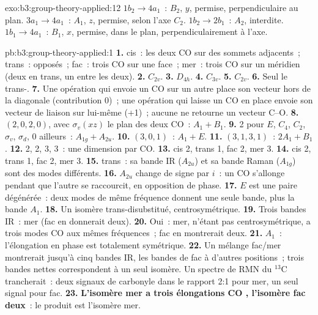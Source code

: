 \begin{solution}{exo:b3:group-theory-applied:12}
$1b_2 \to 4a_1$~: $B_2$, $y$, permise, perpendiculaire au plan. $3a_1 \to 4a_1$~:
$A_1$, $z$, permise, selon l'axe $C_2$. $1b_2 \to 2b_1$~: $A_2$, interdite.
$1b_1 \to 4a_1$~: $B_1$, $x$, permise, dans le plan, perpendiculairement
à l'axe.
\end{solution}

\begin{solution}{pb:b3:group-theory-applied:1}
\textbf{1.} cis~: les deux CO sur des sommets adjacents~; trans~:
opposés~; fac~: trois CO sur une face~; mer~: trois CO sur un méridien
(deux en trans, un entre les deux).
\textbf{2.} $C_{2v}$.
\textbf{3.} $D_{4h}$.
\textbf{4.} $C_{3v}$.
\textbf{5.} $C_{2v}$.
\textbf{6.} Seul le trans-.
\textbf{7.} Une opération qui envoie un CO sur un autre place son vecteur
hors de la diagonale (contribution 0)~; une opération qui laisse un CO en
place envoie son vecteur de liaison sur lui-même (+1)~; aucune ne
retourne un vecteur C--O.
\textbf{8.}  $(2, 0, 2, 0)$, avec $\sigma_v(xz)$ le plan des
deux CO~: $A_1 +
B_1$.
\textbf{9.}  2 pour $E$, $C_4$, $C_2$, $\sigma_v$, $\sigma_d$,
0 ailleurs~:
$A_{1g} + A_{2u}$.
\textbf{10.} $(3, 0, 1)$~: $A_1 + E$.
\textbf{11.} $(3, 1, 3, 1)$~: $2A_1 + B_1$.
\textbf{12.} 2, 2, 3, 3~: une dimension par CO.
\textbf{13.} cis 2, trans 1, fac 2, mer 3.
\textbf{14.} cis 2, trans 1, fac 2, mer 3.
\textbf{15.} trans~: sa bande IR ($A_{2u}$) et sa bande Raman ($A_{1g}$)
sont des modes différents.
\textbf{16.} $A_{2u}$ change de signe par $i$~: un CO s'allonge pendant
que l'autre se raccourcit, en opposition de phase.
\textbf{17.} $E$ est une paire dégénérée~: deux modes de même fréquence
donnent une seule bande, plus la bande $A_1$.
\textbf{18.} Un isomère trans-disubstitué, centrosymétrique.
\textbf{19.} Trois bandes IR~: mer (fac en donnerait deux).
\textbf{20.} Oui~: mer, n'étant pas centrosymétrique, a trois modes CO
 aux mêmes fréquences~; fac en montrerait deux.
\textbf{21.} $A_1$~: l'élongation en phase est totalement symétrique.
\textbf{22.} Un mélange fac/mer montrerait jusqu'à cinq bandes IR, les
bandes de fac à d'autres positions~; trois bandes nettes correspondent à
un seul isomère. Un spectre de RMN du
${}^{13}$C trancherait~: deux signaux de carbonyle dans le rapport 2:1
pour mer, un seul signal pour fac.
\textbf{23.} \textbf{L'isomère mer a trois élongations CO ,
l'isomère fac deux}~: le produit est l'isomère mer.
\end{solution}
